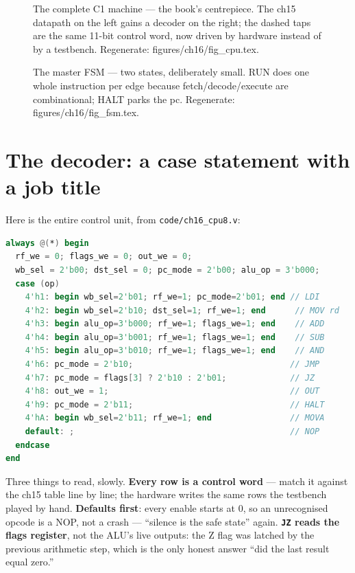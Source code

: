 \begin{figure}[htbp]
\centering

\caption{The complete C1 machine --- the book's centrepiece. The ch15
datapath on the left gains a decoder on the right; the dashed taps
are the same 11-bit control word, now driven by hardware instead of
by a testbench. Regenerate: \ttfamily figures/ch16/fig\_cpu.tex.}
\label{fig:cpu16}
\end{figure}

\begin{figure}[htbp]
\centering

\caption{The master FSM --- two states, deliberately small. RUN does
one whole instruction per edge because fetch/decode/execute are
combinational; HALT parks the pc. Regenerate: \ttfamily
figures/ch16/fig\_fsm.tex.}
\label{fig:fsm16}
\end{figure}

\section{The decoder: a case statement with a job title}\label{sec:decoder16}

Here is the entire control unit, from \texttt{code/ch16\_cpu8.v}:

\begin{lstlisting}[language=Verilog, caption={The decoder: instruction
opcode in, 11-bit control word out --- combinational, so the whole
instruction completes on the next edge. From \ttfamily
code/ch16\_cpu8.v.}, label={lst:decoder16}]
always @(*) begin
  rf_we = 0; flags_we = 0; out_we = 0;
  wb_sel = 2'b00; dst_sel = 0; pc_mode = 2'b00; alu_op = 3'b000;
  case (op)
    4'h1: begin wb_sel=2'b01; rf_we=1; pc_mode=2'b01; end // LDI
    4'h2: begin wb_sel=2'b10; dst_sel=1; rf_we=1; end      // MOV rd
    4'h3: begin alu_op=3'b000; rf_we=1; flags_we=1; end    // ADD
    4'h4: begin alu_op=3'b001; rf_we=1; flags_we=1; end    // SUB
    4'h5: begin alu_op=3'b010; rf_we=1; flags_we=1; end    // AND
    4'h6: pc_mode = 2'b10;                                // JMP
    4'h7: pc_mode = flags[3] ? 2'b10 : 2'b01;             // JZ
    4'h8: out_we = 1;                                     // OUT
    4'h9: pc_mode = 2'b11;                                // HALT
    4'hA: begin wb_sel=2'b11; rf_we=1; end                // MOVA
    default: ;                                            // NOP
  endcase
end
\end{lstlisting}

Three things to read, slowly. \textbf{Every row is a control word}
--- match it against the ch15 table line by line; the hardware writes
the same rows the testbench played by hand. \textbf{Defaults first}:
every enable starts at 0, so an unrecognised opcode is a NOP, not a
crash --- ``silence is the safe state'' again. \textbf{\texttt{JZ}
reads the flags register}, not the ALU's live outputs: the Z flag was
latched by the previous arithmetic step, which is the only honest
answer ``did the last result equal zero.''

